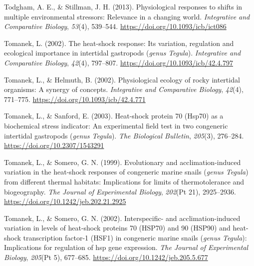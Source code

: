 \documentclass{CSUNthesis}
\begin{document}
Todgham, A. E., \& Stillman, J. H. (2013). Physiological responses to shifts in multiple environmental stressors: Relevance in a changing world. \textit{Integrative and Comparative Biology}, \textit{53}(4), 539--544. \url{https://doi.org/10.1093/icb/ict086}

\vspace{0.1em}

Tomanek, L. (2002). The heat-shock response: Its variation, regulation and ecological importance in intertidal gastropods (\textit{genus Tegula}). \textit{Integrative and Comparative Biology}, \textit{42}(4), 797--807. \url{https://doi.org/10.1093/icb/42.4.797}

\vspace{0.1em}

Tomanek, L., \& Helmuth, B. (2002). Physiological ecology of rocky intertidal organisms: A synergy of concepts. \textit{Integrative and Comparative Biology}, \textit{42}(4), 771--775. \url{https://doi.org/10.1093/icb/42.4.771}

\vspace{0.1em}

Tomanek, L., \& Sanford, E. (2003). Heat-shock protein 70 (Hsp70) as a biochemical stress indicator: An experimental field test in two congeneric intertidal gastropods (\textit{genus Tegula}). \textit{The Biological Bulletin}, \textit{205}(3), 276--284. \url{https://doi.org/10.2307/1543291}

\vspace{0.1em}

Tomanek, L., \& Somero, G. N. (1999). Evolutionary and acclimation-induced variation in the heat-shock responses of congeneric marine snails (\textit{genus Tegula}) from different thermal habitats: Implications for limits of thermotolerance and biogeography. \textit{The Journal of Experimental Biology}, \textit{202}(Pt 21), 2925--2936. \url{https://doi.org/10.1242/jeb.202.21.2925}

\vspace{0.1em}

Tomanek, L., \& Somero, G. N. (2002). Interspecific- and acclimation-induced variation in levels of heat-shock proteins 70 (HSP70) and 90 (HSP90) and heat-shock transcription factor-1 (HSF1) in congeneric marine snails (\textit{genus Tegula}): Implications for regulation of hsp gene expression. \textit{The Journal of Experimental Biology}, \textit{205}(Pt 5), 677--685. \url{https://doi.org/10.1242/jeb.205.5.677}

\vspace{0.1em}
\end{document}
